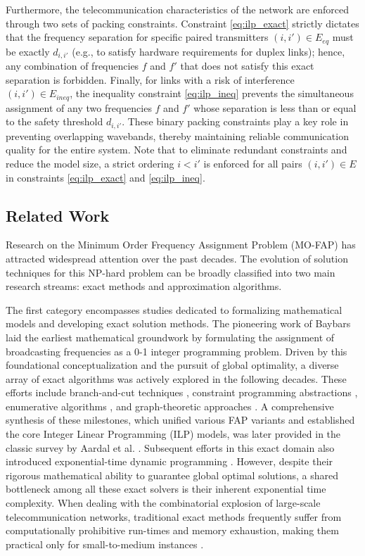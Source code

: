 \documentclass[letterpaper,journal]{IEEEtran}
\begin{document}
Furthermore, the telecommunication characteristics of the network are enforced through two sets of packing constraints. Constraint \eqref{eq:ilp_exact} strictly dictates that the frequency separation for specific paired transmitters $(i,i') \in E_{eq}$ must be exactly $d_{i,i'}$ (e.g., to satisfy hardware requirements for duplex links); hence, any combination of frequencies $f$ and $f'$ that does not satisfy this exact separation is forbidden. Finally, for links with a risk of interference $(i,i') \in E_{ineq}$, the inequality constraint \eqref{eq:ilp_ineq} prevents the simultaneous assignment of any two frequencies $f$ and $f'$ whose separation is less than or equal to the safety threshold $d_{i,i'}$. These binary packing constraints play a key role in preventing overlapping wavebands, thereby maintaining reliable communication quality for the entire system. 
Note that to eliminate redundant constraints and reduce the model size, a strict ordering $i < i'$ is enforced for all pairs $(i, i') \in E$ in constraints \eqref{eq:ilp_exact} and \eqref{eq:ilp_ineq}.

\subsection{Related Work}

Research on the Minimum Order Frequency Assignment Problem (MO-FAP) has attracted widespread attention over the past decades. The evolution of solution techniques for this NP-hard problem can be broadly classified into two main research streams: exact methods and approximation algorithms.

The first category encompasses studies dedicated to formalizing mathematical models and developing exact solution methods. The pioneering work of Baybars \cite{Baybars1982} laid the earliest mathematical groundwork by formulating the assignment of broadcasting frequencies as a 0-1 integer programming problem. Driven by this foundational conceptualization and the pursuit of global optimality, a diverse array of exact algorithms was actively explored in the following decades. These efforts include branch-and-cut techniques \cite{Aardal1996, Fischetti2000}, constraint programming abstractions \cite{Walser1996, Koster1998}, enumerative algorithms \cite{Mannino2003}, and graph-theoretic approaches \cite{Kral2005}. A comprehensive synthesis of these milestones, which unified various FAP variants and established the core Integer Linear Programming (ILP) models, was later provided in the classic survey by Aardal et al. \cite{Aardal2007}. Subsequent efforts in this exact domain also introduced exponential-time dynamic programming \cite{Uyanik2014}. However, despite their rigorous mathematical ability to guarantee global optimal solutions, a shared bottleneck among all these exact solvers is their inherent exponential time complexity. When dealing with the combinatorial explosion of large-scale telecommunication networks, traditional exact methods frequently suffer from computationally prohibitive run-times and memory exhaustion, making them practical only for small-to-medium instances \cite{Aardal2007,Mahmoudi2023}.
\end{document}
